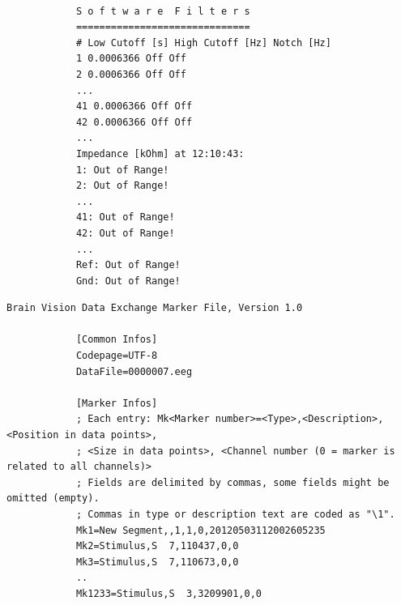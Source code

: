 \documentclass{diplomka}
\begin{document}
		\begin{center}

			\end{center}
			\begin{lstlisting}[frame=single,caption={The header file example - Information about used software filters.},label=HeaderFile5]
			
			S o f t w a r e  F i l t e r s
			==============================
			# Low Cutoff [s] High Cutoff [Hz] Notch [Hz]
			1 0.0006366 Off Off
			2 0.0006366 Off Off
			...
			41 0.0006366 Off Off
			42 0.0006366 Off Off
			...
			Impedance [kOhm] at 12:10:43:
			1: Out of Range!
			2: Out of Range!
			...
			41: Out of Range!
			42: Out of Range!
			...
			Ref: Out of Range!
			Gnd: Out of Range!
			\end{lstlisting}
	\newpage		
			\begin{lstlisting}[frame=single,caption={The vmrk file example - information about stimuli},label=vmrk_file]
			Brain Vision Data Exchange Marker File, Version 1.0
			
			[Common Infos]
			Codepage=UTF-8
			DataFile=0000007.eeg
			
			[Marker Infos]
			; Each entry: Mk<Marker number>=<Type>,<Description>,<Position in data points>,
			; <Size in data points>, <Channel number (0 = marker is related to all channels)>
			; Fields are delimited by commas, some fields might be omitted (empty).
			; Commas in type or description text are coded as "\1".
			Mk1=New Segment,,1,1,0,20120503112002605235
			Mk2=Stimulus,S  7,110437,0,0
			Mk3=Stimulus,S  7,110673,0,0
			..
			Mk1233=Stimulus,S  3,3209901,0,0
			\end{lstlisting}
\end{document}
